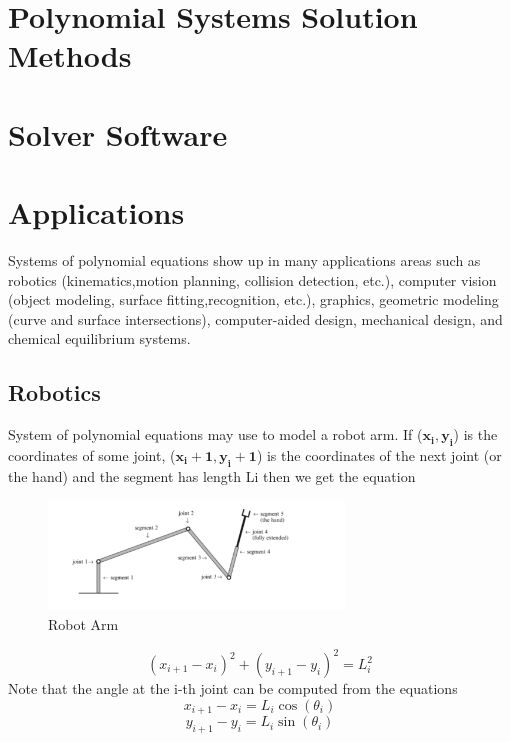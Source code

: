 \documentclass[11pt]{article}
\begin{document}
\section{Polynomial Systems Solution Methods}


\section{Solver Software}

\section{Applications}
Systems of polynomial equations show up in many applications areas such as robotics (kinematics,motion planning, collision detection, etc.), computer vision (object modeling, surface fitting,recognition, etc.), graphics, geometric modeling (curve and surface intersections), computer-aided design, mechanical design, and chemical equilibrium systems. \cite{yanbinjiaArticle}
\subsection{Robotics}
System of polynomial equations may use to model a robot arm. If  ($\mathbf{x_i, y_i}$) is the coordinates of some joint,  ($\mathbf{x_i+1, y_i+1}$) is the coordinates of the next joint (or the hand) and the segment has length Li then we get the equation \cite{richterArticle}
\begin{figure}[H]
  \begin{center}
    \includegraphics[width=0.70\textwidth]{robotarm.png}
    \caption{Robot Arm}
    \label{fig: Robot Arm}
  \end{center}
\end{figure}

 \begin{equation}
    (x_{i+1}-x_i)^2 + (y_{i+1}-y_i)^2=L_i^2
\end{equation}
Note that the angle at the i-th joint can be computed from the equations
 \begin{equation}
    x_{i+1}-x_i = L_i \cos(\theta_i)
\end{equation}
 \begin{equation}
    y_{i+1}-y_i = L_i \sin(\theta_i)
\end{equation}
\end{document}

